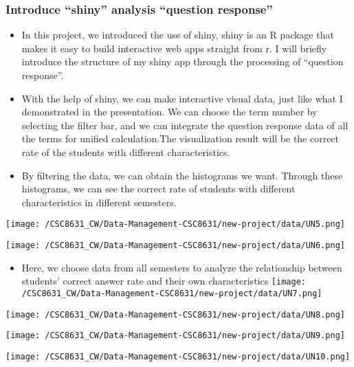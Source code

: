 \documentclass[]{article}
\providecommand{\tightlist}{%
  \setlength{\itemsep}{0pt}\setlength{\parskip}{0pt}}
\begin{document}
\hypertarget{introduce-shiny-analysis-question-response}{%
\subsubsection{Introduce ``shiny'' analysis ``question
response''}\label{introduce-shiny-analysis-question-response}}

\begin{itemize}
\tightlist
\item
  In this project, we introduced the use of shiny, shiny is an R package
  that makes it easy to build interactive web apps straight from r. I
  will briefly introduce the structure of my shiny app through the
  processing of ``question response''. 
\item
  With the help of shiny, we can make interactive visual data, just like
  what I demonstrated in the presentation. We can choose the term number
  by selecting the filter bar, and we can integrate the question
  response data of all the terms for unified calculation.The
  visualization result will be the correct rate of the students with
  different characteristics. 
\item
  By filtering the data, we can obtain the histograms we want. Through
  these histograms, we can see the correct rate of students with
  different characteristics in different semesters.
\end{itemize}

\texttt{[image: /CSC8631\_CW/Data-Management-CSC8631/new-project/data/UN5.png]}

\texttt{[image: /CSC8631\_CW/Data-Management-CSC8631/new-project/data/UN6.png]}

\begin{itemize}
\tightlist
\item
  Here, we choose data from all semesters to analyze the relationship
  between students' correct answer rate and their own characteristics
  \texttt{[image: /CSC8631\_CW/Data-Management-CSC8631/new-project/data/UN7.png]}
\end{itemize}

\texttt{[image: /CSC8631\_CW/Data-Management-CSC8631/new-project/data/UN8.png]}

\texttt{[image: /CSC8631\_CW/Data-Management-CSC8631/new-project/data/UN9.png]}

\texttt{[image: /CSC8631\_CW/Data-Management-CSC8631/new-project/data/UN10.png]}
\end{document}
